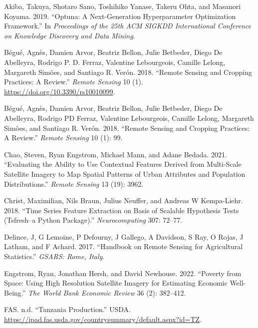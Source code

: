 \documentclass[
  journal,
  twocolumn]{IEEEtran}
\newlength{\cslhangindent}
\newlength{\cslentryspacingunit} %
\newenvironment{CSLReferences}[2] %
 {%
  \setlength{\parindent}{0pt}
  \ifodd #1
  \let\oldpar\par
  \def\par{\hangindent=\cslhangindent\oldpar}
  \fi
  \setlength{\parskip}{#2\cslentryspacingunit}
 }%
 {}
\begin{document}
\hypertarget{refs}{}
\begin{CSLReferences}{1}{0}
\leavevmode{}%
Akiba, Takuya, Shotaro Sano, Toshihiko Yanase, Takeru Ohta, and Masanori
Koyama. 2019. {``Optuna: A Next-Generation Hyperparameter Optimization
Framework.''} In \emph{Proceedings of the 25th {ACM} {SIGKDD}
International Conference on Knowledge Discovery and Data Mining}.

\leavevmode{}%
Bégué, Agnès, Damien Arvor, Beatriz Bellon, Julie Betbeder, Diego De
Abelleyra, Rodrigo P. D. Ferraz, Valentine Lebourgeois, Camille Lelong,
Margareth Simões, and Santiago R. Verón. 2018. {``Remote Sensing and
Cropping Practices: A Review.''} \emph{Remote Sensing} 10 (1).
\url{https://doi.org/10.3390/rs10010099}.

\leavevmode{}%
Bégué, Agnès, Damien Arvor, Beatriz Bellon, Julie Betbeder, Diego De
Abelleyra, Rodrigo PD Ferraz, Valentine Lebourgeois, Camille Lelong,
Margareth Simões, and Santiago R. Verón. 2018. {``Remote Sensing and
Cropping Practices: A Review.''} \emph{Remote Sensing} 10 (1): 99.

\leavevmode{}%
Chao, Steven, Ryan Engstrom, Michael Mann, and Adane Bedada. 2021.
{``Evaluating the Ability to Use Contextual Features Derived from
Multi-Scale Satellite Imagery to Map Spatial Patterns of Urban
Attributes and Population Distributions.''} \emph{Remote Sensing} 13
(19): 3962.

\leavevmode{}%
Christ, Maximilian, Nils Braun, Julius Neuffer, and Andreas W
Kempa-Liehr. 2018. {``Time Series Feature Extraction on Basis of
Scalable Hypothesis Tests (Tsfresh--a Python Package).''}
\emph{Neurocomputing} 307: 72--77.

\leavevmode{}%
Delince, J, G Lemoine, P Defourny, J Gallego, A Davidson, S Ray, O
Rojas, J Latham, and F Achard. 2017. {``Handbook on Remote Sensing for
Agricultural Statistics.''} \emph{GSARS: Rome, Italy}.

\leavevmode{}%
Engstrom, Ryan, Jonathan Hersh, and David Newhouse. 2022. {``Poverty
from Space: Using High Resolution Satellite Imagery for Estimating
Economic Well-Being.''} \emph{The World Bank Economic Review} 36 (2):
382--412.

\leavevmode{}%
FAS. n.d. {``Tanzania Production.''} USDA.
\url{https://ipad.fas.usda.gov/countrysummary/default.aspx?id=TZ}.


\end{CSLReferences}
\end{document}
